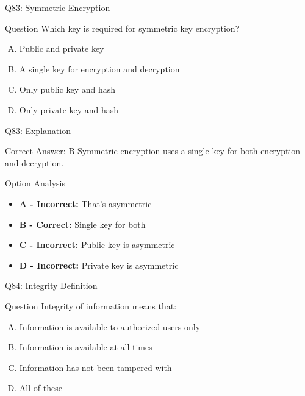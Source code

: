 \documentclass{beamer}
\begin{document}
	\begin{frame}{Q83: Symmetric Encryption}
		\begin{block}{Question}
			Which key is required for symmetric key encryption?
		\end{block}
		\begin{enumerate}[(A)]
			\item Public and private key
			\item A single key for encryption and decryption
			\item Only public key and hash
			\item Only private key and hash
		\end{enumerate}
	\end{frame}
	
	\begin{frame}{Q83: Explanation}
		\begin{block}{Correct Answer: B}
			Symmetric encryption uses a single key for both encryption and decryption.
		\end{block}
		\begin{block}{Option Analysis}
			\begin{itemize}
				\item \textbf{A - Incorrect:} That's asymmetric
				\item \textbf{B - Correct:} Single key for both
				\item \textbf{C - Incorrect:} Public key is asymmetric
				\item \textbf{D - Incorrect:} Private key is asymmetric
			\end{itemize}
		\end{block}
	\end{frame}
	
	\begin{frame}{Q84: Integrity Definition}
		\begin{block}{Question}
			Integrity of information means that:
		\end{block}
		\begin{enumerate}[(A)]
			\item Information is available to authorized users only
			\item Information is available at all times
			\item Information has not been tampered with
			\item All of these
		\end{enumerate}
	\end{frame}
	
\end{document}
